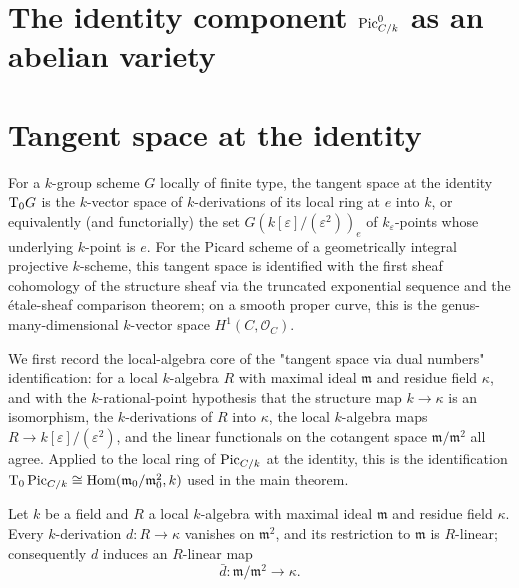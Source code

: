 \section{The identity component \(\operatorname{Pic}^0_{C/k}\) as an abelian variety}
\label{mk-chap:Picard_Pic0AbelianVariety}
\providecommand{\tu}{\textup}

\section{Tangent space at the identity}
\label{mk-sec:pic0_tangent_space}

For a \(k\)-group scheme \(G\) locally of finite type, the tangent
space at the identity \(\tu T_0 G\) is the \(k\)-vector space of
\(k\)-derivations of its local ring at \(e\) into \(k\), or
equivalently (and functorially) the set
\(G(k[\varepsilon]/(\varepsilon^2))_e\) of \(k_\varepsilon\)-points
whose underlying \(k\)-point is \(e\). For the Picard scheme of a
geometrically integral projective \(k\)-scheme, this tangent space is
identified with the first sheaf cohomology of the structure sheaf via
the truncated exponential sequence and the étale-sheaf comparison
theorem; on a smooth proper curve, this is the genus-many-dimensional
\(k\)-vector space \(H^1(C, \mathcal{O}_C)\).

We first record the local-algebra core of the "tangent space via dual
numbers" identification: for a local \(k\)-algebra \(R\) with maximal
ideal \(\mathfrak m\) and residue field \(\kappa\), and with the
\(k\)-rational-point hypothesis that the structure map
\(k \to \kappa\) is an isomorphism, the \(k\)-derivations of \(R\)
into \(\kappa\), the local \(k\)-algebra maps
\(R \to k[\varepsilon]/(\varepsilon^2)\), and the linear functionals
on the cotangent space \(\mathfrak m/\mathfrak m^2\) all agree.
Applied to the local ring of \(\operatorname{Pic}_{C/k}\) at the identity, this is
the identification \(\tu T_0 \Pic_{C/k} \cong
\Hom(\mathfrak m_0/\mathfrak m_0^2, k)\) used in the main theorem.

\begin{lemma}\label{mk-lem:tangent_derivation_descends}
  \leanok

  Let \(k\) be a field and \(R\) a local \(k\)-algebra with maximal
  ideal \(\mathfrak m\) and residue field \(\kappa\). Every
  \(k\)-derivation \(d : R \to \kappa\) vanishes on
  \(\mathfrak m^2\), and its restriction to \(\mathfrak m\) is
  \(R\)-linear; consequently \(d\) induces an \(R\)-linear map
  \[
    \bar d : \mathfrak m/\mathfrak m^2 \longrightarrow \kappa .
  \]
\end{lemma}

